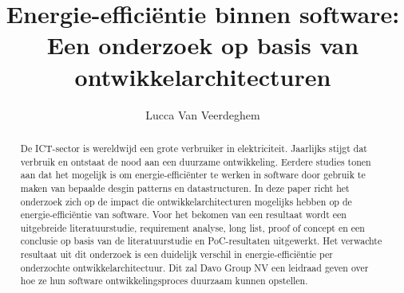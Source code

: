 \documentclass{hogent-article}
\title{Energie-efficiëntie binnen software: Een onderzoek op basis van ontwikkelarchitecturen}
\author{Lucca Van Veerdeghem}
\begin{document}
\begin{abstract}
De ICT-sector is wereldwijd een grote verbruiker in elektriciteit. Jaarlijks stijgt dat verbruik en ontstaat de nood aan een duurzame ontwikkeling. Eerdere studies tonen aan dat het mogelijk is om energie-efficiënter te werken in software door gebruik te maken van bepaalde desgin patterns en datastructuren. In deze paper richt het onderzoek zich op de impact die ontwikkelarchitecturen mogelijks hebben op de energie-efficiëntie van software. Voor het bekomen van een resultaat wordt een uitgebreide literatuurstudie, requirement analyse, long list, proof of concept en een conclusie op basis van de literatuurstudie en PoC-resultaten uitgewerkt. Het verwachte resultaat uit dit onderzoek is een duidelijk verschil in energie-efficiëntie per onderzochte ontwikkelarchitectuur. Dit zal Davo Group NV een leidraad geven over hoe ze hun software ontwikkelingsproces duurzaam kunnen opstellen.


    
\end{abstract}

\tableofcontents



\printbibliography[heading=bibintoc]
\end{document}
